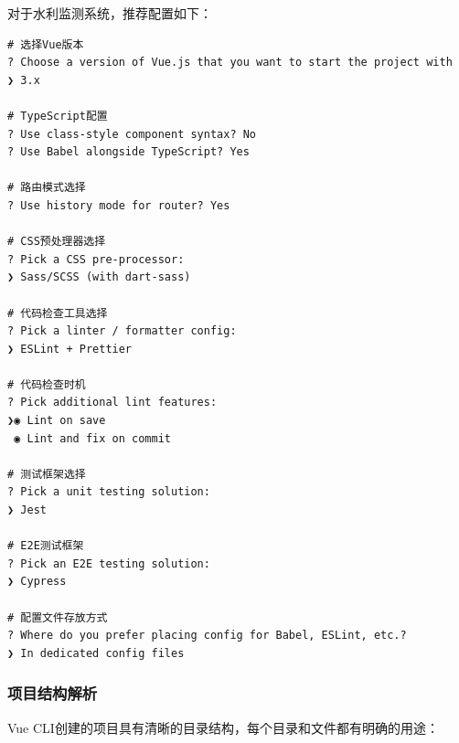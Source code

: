 对于水利监测系统，推荐配置如下：

\begin{lstlisting}[style=terminal]
# 选择Vue版本
? Choose a version of Vue.js that you want to start the project with 
❯ 3.x

# TypeScript配置
? Use class-style component syntax? No
? Use Babel alongside TypeScript? Yes

# 路由模式选择
? Use history mode for router? Yes

# CSS预处理器选择
? Pick a CSS pre-processor:
❯ Sass/SCSS (with dart-sass)

# 代码检查工具选择
? Pick a linter / formatter config:
❯ ESLint + Prettier

# 代码检查时机
? Pick additional lint features:
❯◉ Lint on save
 ◉ Lint and fix on commit

# 测试框架选择
? Pick a unit testing solution:
❯ Jest

# E2E测试框架
? Pick an E2E testing solution:
❯ Cypress

# 配置文件存放方式
? Where do you prefer placing config for Babel, ESLint, etc.?
❯ In dedicated config files
\end{lstlisting}

\hypertarget{ux9879ux76eeux7ed3ux6784ux89e3ux6790}{%
\subsubsection{项目结构解析}\label{ux9879ux76eeux7ed3ux6784ux89e3ux6790}}

Vue CLI创建的项目具有清晰的目录结构，每个目录和文件都有明确的用途：

